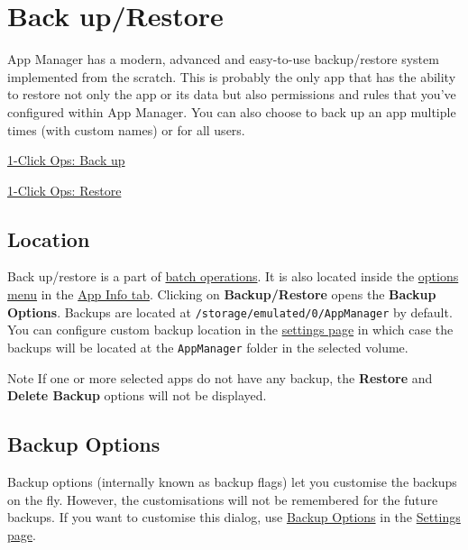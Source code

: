 \section{Back up/Restore}\label{sec:backup-restore} %
App Manager has a modern, advanced and easy-to-use backup/restore system implemented from the scratch.
This is probably the only app that has the ability to restore not only the app or its data but also permissions and
rules that you've configured within App Manager.
You can also choose to back up an app multiple times (with custom names) or for all users.

\begin{amseealso}
    \item \hyperref[subsec:1-click-back-up]{1-Click Ops: Back up}
    \item \hyperref[subsec:1-click-restore]{1-Click Ops: Restore}
\end{amseealso}

\subsection{Location}\label{subsec:backup-location} %
Back up/restore is a part of \hyperref[subsec:batch-operations]{batch operations}.
It is also located inside the \hyperref[subsubsec:app-info-options-menu]{options menu} in the
\hyperref[subsec:app-info-tab]{App Info tab}.
Clicking on \textbf{Backup/Restore} opens the \textbf{Backup Options}.
Backups are located at \texttt{/storage/emulated/0/AppManager} by default.
You can configure custom backup location in the \hyperref[subsubsec:backup-volume]{settings page} in which case the backups
will be located at the \texttt{AppManager} folder in the selected volume.

\begin{tip}{Note}
    If one or more selected apps do not have any backup, the \textbf{Restore} and \textbf{Delete Backup} options will
    not be displayed.
\end{tip}

\subsection{Backup Options}\label{subsec:backup-restore-backup-options} %
Backup options (internally known as backup flags) let you customise the backups on the fly.
However, the customisations will not be remembered for the future backups.
If you want to customise this dialog, use \hyperref[subsubsec:settings-backup-options]{Backup Options} in the \hyperref[sec:settings-page]{Settings page}.

